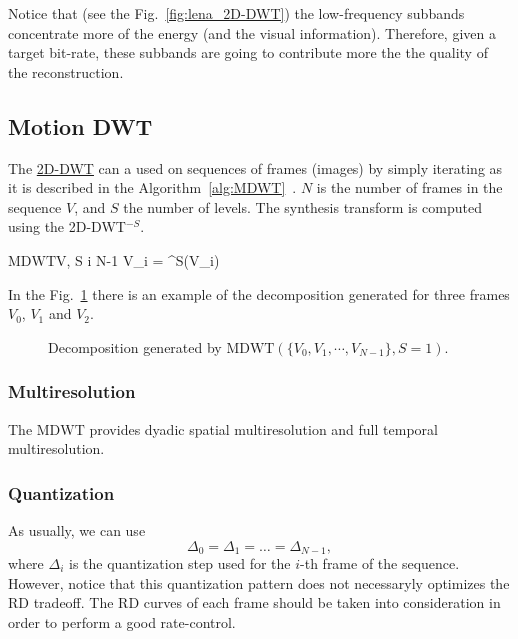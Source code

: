 Notice that (see the Fig.~\ref{fig:lena_2D-DWT}) the low-frequency
subbands concentrate more of the energy (and the visual
information). Therefore, given a target bit-rate, these subbands are going to contribute more the the quality of the reconstruction.

\subsection{Motion DWT}

The
\href{https://sistemas-multimedia.github.io/milestones/06-2D-DWT/}{2D-DWT}
can a used on sequences of frames (images) by simply iterating as it
is described in the
Algorithm~\ref{alg:MDWT}~\cite{taubman2002jpeg2000}. $N$ is the number
of frames in the sequence $V$, and $S$ the number of levels. The
synthesis transform is computed using the 2D-DWT$^{-S}$.

\begin{pseudocode}{$\text{MDWT}$}{V, S}
  \label{alg:MDWT}
  \FOR i  \TO N-1 \DO
  V_i = ^S(V_i)
\end{pseudocode}

In the Fig.~\ref{fig:MDWT} there is an example of the decomposition
generated for three frames $V_0$, $V_1$ and $V_2$.

\begin{figure}
  \centering
  \caption{Decomposition generated by $\text{MDWT}(\{V_0, V_1, \cdots, V_{N-1}\}, S=1)$.}
  \label{fig:MDWT}
\end{figure}

\subsubsection{Multiresolution}
The $\text{MDWT}$ provides dyadic spatial multiresolution and full
temporal multiresolution.

\subsubsection{Quantization}
As usually, we can use
\begin{equation}
  \Delta_0=\Delta_1=\dots=\Delta_{N-1},
\end{equation}
where $\Delta_i$ is the quantization step used for the $i$-th frame of
the sequence. However, notice that this quantization pattern does not
necessaryly optimizes the RD tradeoff. The RD curves of each frame
should be taken into consideration in order to perform a good
rate-control.

